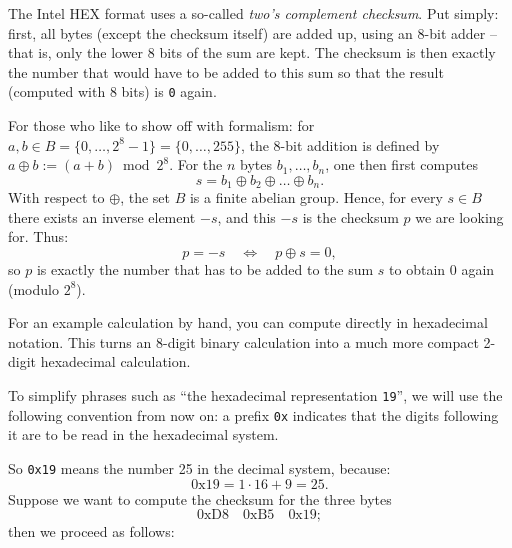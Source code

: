 \documentclass[a4paper,12pt]{article}
\begin{document}
\begin{tcolorbox}[
    colback=myblue!5!white,
    colframe=myblue,
    title=Computing the checksum in the Intel HEX format
]
    The Intel HEX format uses a so-called \emph{two's complement checksum}.
    Put simply: first, all bytes (except the checksum itself) are added up,
    using an 8-bit adder – that is, only the lower 8 bits of the sum are
    kept. The checksum is then exactly the number that would have to be
    added to this sum so that the result (computed with 8 bits) is
    \texttt{0} again.

    For those who like to show off with formalism: for
    $a, b \in B = \{0,\dots,2^8-1\} = \{0,\dots,255\}$,
    the 8-bit addition is defined by $a \oplus b := (a + b) \bmod 2^8$.
    For the $n$ bytes $b_1, \dots, b_n$, one then first computes
    \[
	s = b_1 \oplus b_2 \oplus \dots \oplus b_n.
    \]
    With respect to $\oplus$, the set $B$ is a finite abelian group.
    Hence, for every $s \in B$ there exists an inverse element $-s$, and
    this $-s$ is the checksum $p$ we are looking for. Thus:
    \[
	p = -s \quad \Leftrightarrow \quad p \oplus s = 0,
    \]
    so $p$ is exactly the number that has to be added to the sum $s$ to
    obtain $0$ again (modulo $2^8$).
\end{tcolorbox}

\noindent
For an example calculation by hand, you can compute directly in hexadecimal
notation. This turns an 8-digit binary calculation into a much more compact
2-digit hexadecimal calculation.

To simplify phrases such as ``the hexadecimal representation \texttt{19}'',
we will use the following convention from now on:
a prefix \texttt{0x} indicates that the digits following it are to be read
in the hexadecimal system.

So \texttt{0x19} means the number 25 in the decimal system, because:
\[
    \text{0x}19 = 1 \cdot 16 + 9 = 25.
\]
Suppose we want to compute the checksum for the three bytes
\[
    \text{0xD8} \quad \text{0xB5} \quad \text{0x19};
\]
then we proceed as follows:
\end{document}
